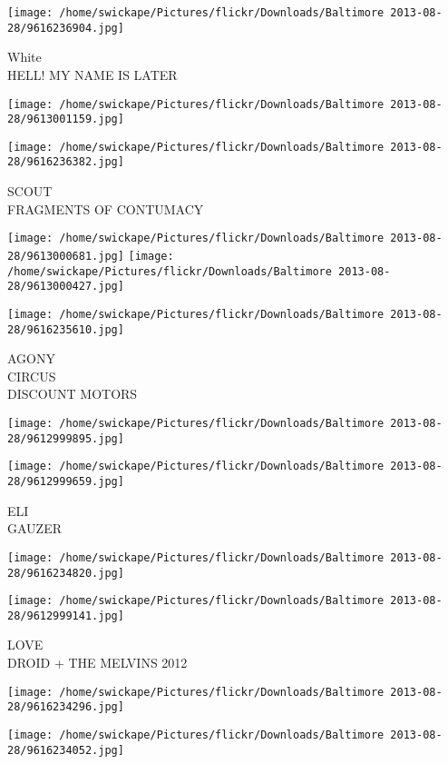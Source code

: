 \documentclass[10pt,letterpaper]{article}
\begin{document}
\vspace{0.25in}
\texttt{[image: /home/swickape/Pictures/flickr/Downloads/Baltimore 2013-08-28/9616236904.jpg]}

White\\
HELL! MY NAME IS LATER
\pagebreak

\texttt{[image: /home/swickape/Pictures/flickr/Downloads/Baltimore 2013-08-28/9613001159.jpg]}

\vspace{0.25in}
\texttt{[image: /home/swickape/Pictures/flickr/Downloads/Baltimore 2013-08-28/9616236382.jpg]}

SCOUT\\
FRAGMENTS OF CONTUMACY
\pagebreak

\texttt{[image: /home/swickape/Pictures/flickr/Downloads/Baltimore 2013-08-28/9613000681.jpg]}
\texttt{[image: /home/swickape/Pictures/flickr/Downloads/Baltimore 2013-08-28/9613000427.jpg]}

\vspace{0.25in}
\texttt{[image: /home/swickape/Pictures/flickr/Downloads/Baltimore 2013-08-28/9616235610.jpg]}

AGONY\\
CIRCUS\\
DISCOUNT MOTORS
\pagebreak

\texttt{[image: /home/swickape/Pictures/flickr/Downloads/Baltimore 2013-08-28/9612999895.jpg]}

\vspace{0.25in}
\texttt{[image: /home/swickape/Pictures/flickr/Downloads/Baltimore 2013-08-28/9612999659.jpg]}

ELI\\
GAUZER
\pagebreak

\texttt{[image: /home/swickape/Pictures/flickr/Downloads/Baltimore 2013-08-28/9616234820.jpg]}

\vspace{0.25in}
\texttt{[image: /home/swickape/Pictures/flickr/Downloads/Baltimore 2013-08-28/9612999141.jpg]}

LOVE\\
DROID + THE MELVINS 2012
\pagebreak

\texttt{[image: /home/swickape/Pictures/flickr/Downloads/Baltimore 2013-08-28/9616234296.jpg]}

\vspace{0.25in}
\texttt{[image: /home/swickape/Pictures/flickr/Downloads/Baltimore 2013-08-28/9616234052.jpg]}
\end{document}
